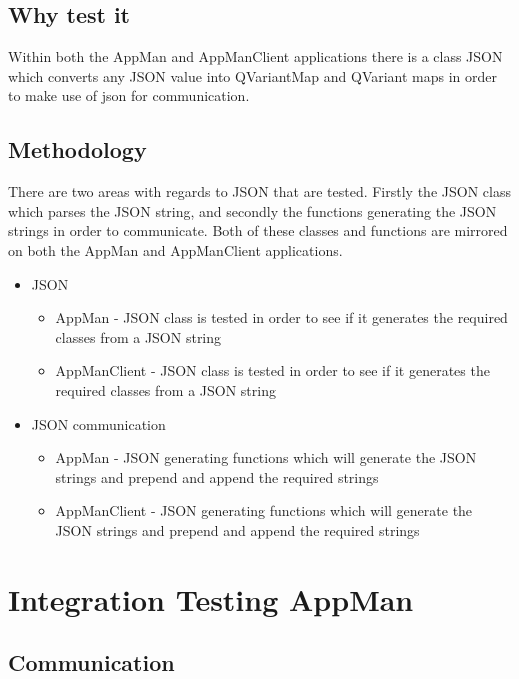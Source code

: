 \documentclass[a4paper,12pt,final]{article}
\begin{document}
\subsection{Why test it}
Within both the AppMan and AppManClient applications there is a class JSON which converts any JSON value into QVariantMap and QVariant maps in order to make use of json for communication.
\subsection{Methodology}
There are two areas with regards to JSON that are tested. Firstly the JSON class which parses the JSON string, and secondly the functions generating the JSON strings in order to communicate. Both of these classes and functions are mirrored on both the AppMan and AppManClient applications.
\begin{itemize}
\item JSON

\begin{itemize}
\item AppMan - JSON class is tested in order to see if it generates the required classes from a JSON string
\item AppManClient - JSON class is tested in order to see if it generates the required classes from a JSON string
\end{itemize}

\item JSON communication
\begin{itemize}
\item AppMan - JSON generating functions which will generate the JSON strings and prepend and append the required strings
\item AppManClient - JSON generating functions which will generate the JSON strings and prepend and append the required strings
\end{itemize}

\end{itemize}





\section{Integration Testing AppMan}
\subsection{Communication}
\end{document}
